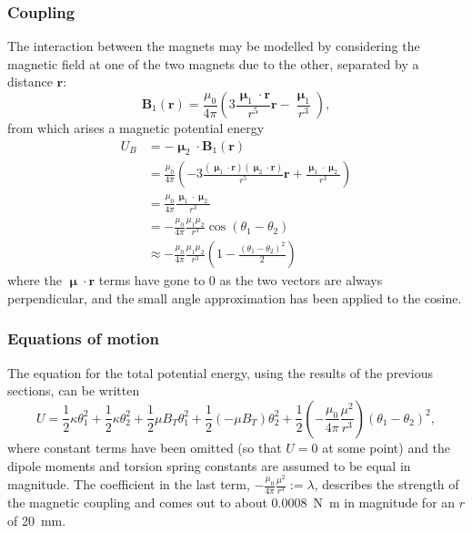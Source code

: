 \documentclass{article}
\begin{document}
\subsubsection{Coupling}
The interaction between the magnets may be modelled by considering the magnetic field at one of the two magnets due to the other, separated by a distance $\mathbf{r}$:
\begin{equation*}
    \mathbf{B}_1(\mathbf{r}) = \frac{\mu_0}{4\pi}\left( 3\frac{\bm{\upmu}_1\cdot\mathbf{r}}{r^5}\mathbf{r} - \frac{\bm{\upmu}_1}{r^3} \right),
\end{equation*}
from which arises a magnetic potential energy
\begin{equation*}
    \begin{aligned}
        U_B &= -\bm{\upmu}_2\cdot \mathbf{B}_1(\mathbf{r}) \\
            &= \frac{\mu_0}{4\pi}\left( -3\frac{(\bm{\upmu}_1\cdot\mathbf{r})(\bm{\upmu}_2\cdot\mathbf{r})}{r^5}\mathbf{r} + \frac{\bm{\upmu}_1\cdot\bm{\upmu}_2}{r^3} \right) \\
            &= \frac{\mu_0}{4\pi}\frac{\bm{\upmu}_1\cdot\bm{\upmu}_2}{r^3} \\
            &= -\frac{\mu_0}{4\pi}\frac{\mu_1\mu_2}{r^3}\cos(\theta_1 - \theta_2) \\
            &\approx -\frac{\mu_0}{4\pi}\frac{\mu_1\mu_2}{r^3} \left( 1 - \frac{(\theta_1 - \theta_2)^2}{2} \right)
    \end{aligned}
\end{equation*}
where the $\bm{\upmu}\cdot \mathbf{r}$ terms have gone to 0 as the two vectors are always perpendicular, and the small angle approximation has been applied to the cosine.

\subsubsection{Equations of motion}
The equation for the total potential energy, using the results of the previous sections, can be written
\begin{equation*}
    U = \frac{1}{2}\kappa\theta_1^2 + \frac{1}{2}\kappa\theta_2^2+ \frac{1}{2}\mu B_T\theta_1^2 + \frac{1}{2}\left( -\mu B_T \right)\theta_2^2 + \frac{1}{2}\left( -\frac{\mu_0}{4\pi}\frac{\mu^2}{r^3} \right)\left( \theta_1 - \theta_2 \right)^2,
\end{equation*}
where constant terms have been omitted (so that $U=0$ at some point) and the dipole moments and torsion spring constants are assumed to be equal in magnitude.
The coefficient in the last term, $-\frac{\mu_0}{4\pi}\frac{\mu^2}{r^3} := \lambda$, describes the strength of the magnetic coupling and comes out to about \qty{0.0008}{N.m} in magnitude for an $r$ of \qty{20}{mm}.
\end{document}
